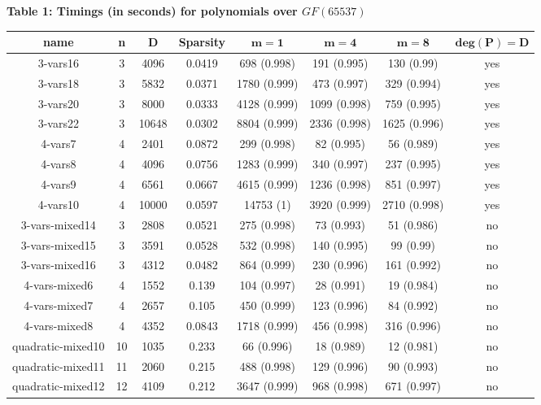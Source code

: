 \documentclass[12pt]{article}
\begin{document}
\bgroup
\def\arraystretch{1.5}
\setlength\tabcolsep{6pt}
\begin{center}
	\textbf{Table 1: Timings (in seconds) for polynomials over $GF(65537)$}
\begin{tabular}{c|c|c|c|c|c|c|c}
	\textbf{name}& n& $\mathbf{D}$ & \textbf{Sparsity} & $\mathbf{m = 1}$ & $\mathbf{m = 4}$ & $\mathbf{m = 8}$ & $\mathbf{deg(P) = D}$\\
	\hline
	3-vars16&3 &4096&0.0419&698 (0.998)&191 (0.995)&130 (0.99)&yes\\
	3-vars18&3 &5832&0.0371&1780 (0.999)&473 (0.997)&329 (0.994)&yes\\
	3-vars20&3 &8000&0.0333&4128 (0.999)&1099 (0.998)&759 (0.995)&yes\\
	3-vars22&3 &10648&0.0302&8804 (0.999)&2336 (0.998)&1625 (0.996)&yes\\
	4-vars7&4 &2401&0.0872&299 (0.998)&82 (0.995)&56 (0.989)&yes\\
	4-vars8&4 &4096&0.0756&1283 (0.999)&340 (0.997)&237 (0.995)&yes\\
	4-vars9&4 &6561&0.0667&4615 (0.999)&1236 (0.998)&851 (0.997)&yes\\
	4-vars10&4 &10000&0.0597&14753 (1)&3920 (0.999)&2710 (0.998)&yes\\
	
	3-vars-mixed14&3 &2808&0.0521&275 (0.998)&73 (0.993)&51 (0.986)&no\\
	3-vars-mixed15&3 &3591&0.0528&532 (0.998)&140 (0.995)&99 (0.99)&no\\
	3-vars-mixed16&3 &4312&0.0482&864 (0.999)&230 (0.996)&161 (0.992)&no\\
	4-vars-mixed6&4 &1552&0.139&104 (0.997)&28 (0.991)&19 (0.984)&no\\
	4-vars-mixed7&4 &2657&0.105&450 (0.999)&123 (0.996)&84 (0.992)&no\\
	4-vars-mixed8&4 &4352&0.0843&1718 (0.999)&456 (0.998)&316 (0.996)&no\\
	
	quadratic-mixed10&10 &1035&0.233&66 (0.996)&18 (0.989)&12 (0.981)&no\\
	quadratic-mixed11&11 &2060&0.215&488 (0.998)&129 (0.996)&90 (0.993)&no\\
	quadratic-mixed12&12 &4109&0.212&3647 (0.999)&968 (0.998)&671 (0.997)&no\\
	

\end{tabular}
\end{center}
\end{document}
